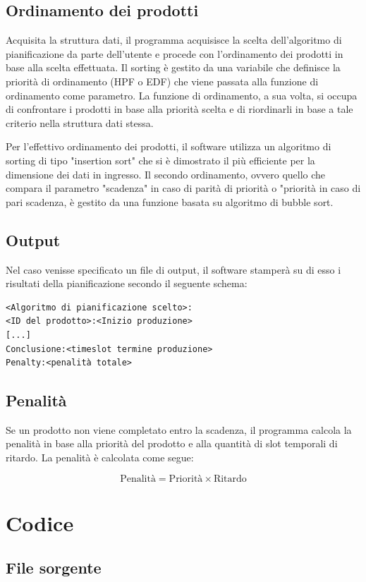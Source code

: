 \documentclass[a4paper]{report}
\begin{document}
\subsection{Ordinamento dei prodotti}
Acquisita la struttura dati, il programma acquisisce la scelta dell'algoritmo di pianificazione da parte dell'utente e procede con l'ordinamento dei prodotti in base alla scelta effettuata.
Il sorting è gestito da una variabile che definisce la priorità di ordinamento (HPF o EDF) che viene passata alla funzione di ordinamento come parametro. La funzione di ordinamento, a sua volta, si occupa di confrontare i prodotti in base alla priorità scelta e di riordinarli in base a tale criterio nella struttura dati stessa.

Per l'effettivo ordinamento dei prodotti, il software utilizza un algoritmo di sorting di tipo "insertion sort" che si è dimostrato il più efficiente per la dimensione dei dati in ingresso.
Il secondo ordinamento, ovvero quello che compara il parametro "scadenza" in caso di parità di priorità o "priorità in caso di pari scadenza, è gestito da una funzione basata su algoritmo di bubble sort.

\subsection{Output}
Nel caso venisse specificato un file di output, il software stamperà su di esso i risultati della pianificazione secondo il seguente schema:
\begin{verbatim}
<Algoritmo di pianificazione scelto>:
<ID del prodotto>:<Inizio produzione>
[...]
Conclusione:<timeslot termine produzione>
Penalty:<penalità totale>
\end{verbatim}

\subsection{Penalità}
Se un prodotto non viene completato entro la scadenza, il programma calcola la penalità in base alla priorità del prodotto e alla quantità di slot temporali di ritardo. La penalità è calcolata come segue:

\[
\text{Penalità} = \text{Priorità} \times \text{Ritardo}
\]


\section{Codice}


\subsection{File sorgente}
\end{document}

